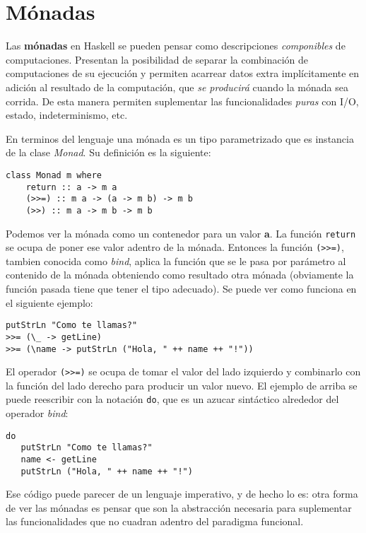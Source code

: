 \section{Mónadas} %
\label{sec:m_nadas}

Las \textbf{mónadas} en Haskell se pueden pensar como descripciones
\textit{componibles} de computaciones. Presentan la posibilidad de separar la
combinación de computaciones de su ejecución y permiten acarrear datos extra
implícitamente en adición al resultado de la computación, que
\textit{se producirá} cuando la mónada sea corrida. De esta manera permiten
suplementar las funcionalidades \textit{puras} con I/O, estado, indeterminismo,
etc.

En terminos del lenguaje una mónada es un tipo parametrizado que es instancia
de la clase \textit{Monad}. Su definición es la siguiente:

\begin{lstlisting}
class Monad m where
    return :: a -> m a
    (>>=) :: m a -> (a -> m b) -> m b
    (>>) :: m a -> m b -> m b
\end{lstlisting}

Podemos ver la mónada como un contenedor para un valor \textbf{a}. La función
\lstinline$return$ se ocupa de poner ese valor adentro de la mónada. Entonces
la función \lstinline$(>>=)$, tambien conocida como \textit{bind}, aplica la
función que se le pasa por parámetro al contenido de la mónada obteniendo como
resultado otra mónada (obviamente la función pasada tiene que tener el tipo
adecuado). Se puede ver como funciona en el siguiente ejemplo:

\begin{lstlisting}
putStrLn "Como te llamas?"
>>= (\_ -> getLine)
>>= (\name -> putStrLn ("Hola, " ++ name ++ "!"))
\end{lstlisting}

El operador \lstinline$(>>=)$ se ocupa de tomar el valor del lado izquierdo
y combinarlo con la función del lado derecho para producir un valor nuevo. El
ejemplo de arriba se puede reescribir con la notación \lstinline$do$, que es un
azucar sintáctico alrededor del operador \textit{bind}:

\begin{lstlisting}
do
   putStrLn "Como te llamas?"
   name <- getLine
   putStrLn ("Hola, " ++ name ++ "!")
\end{lstlisting}

Ese código puede parecer de un lenguaje imperativo, y de hecho lo es: otra
forma de ver las mónadas es pensar que son la abstracción necesaria para
suplementar las funcionalidades que no cuadran adentro del paradigma funcional.

